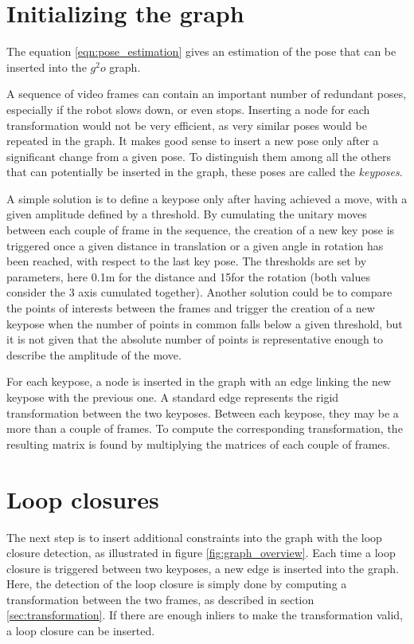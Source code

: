\section{Initializing the graph}

The equation \ref{eqn:pose_estimation} gives an estimation of the pose that can be inserted into the $g^2o$ graph.

A sequence of video frames can contain an important number of redundant poses, especially if the robot slows down, or even stops. Inserting a node for each transformation would not be very efficient, as very similar poses would be repeated in the graph. It makes good sense to insert a new pose only after a significant change from a given pose. To distinguish them among all the others that can potentially be inserted in the graph, these poses are called the \emph{keyposes}. 

A simple solution is to define a keypose only after having achieved a move, with a given amplitude defined by a threshold. By cumulating the unitary moves between each couple of frame in the sequence, the creation of a new key pose is triggered once a given distance in translation or a given angle in rotation has been reached,  with respect to the last key pose. The thresholds are set by parameters, here 0.1m for the distance and 15\textdegree for the rotation (both values consider the 3 axis cumulated together). Another solution could be to compare the points of interests between the frames and trigger the creation of a new keypose when the number of points in common falls below a given threshold, but it is not given that the absolute number of points is representative enough to describe the amplitude of the move.

For each keypose, a node is inserted in the graph with an edge linking the new keypose with the previous one. A standard edge represents the rigid transformation between the two keyposes. Between each keypose, they may be a more than a couple of frames. To compute the corresponding transformation, the resulting matrix is found by multiplying the matrices of each couple of frames.

\section{Loop closures}

The next step is to insert additional constraints into the graph with the loop closure detection, as illustrated in figure \ref{fig:graph_overview}. Each time a loop closure is triggered between two keyposes, a new edge is inserted into the graph. Here, the detection of the loop closure is simply done by computing a transformation between the two frames, as described in section \ref{sec:transformation}. If there are enough inliers to make the transformation valid, a loop closure can be inserted.

